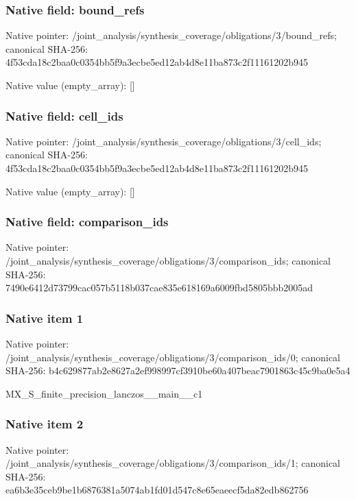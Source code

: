 \documentclass[10pt,a4paper]{article}
\begin{document}
\subsubsection{Native field: bound\_\allowbreak{}refs}
Native pointer: /joint\_\allowbreak{}analysis/synthesis\_\allowbreak{}coverage/obligations/3/bound\_\allowbreak{}refs; canonical SHA-256: 4f53cda18c2baa0c0354bb5f9a3ecbe5ed12ab4d8e11ba873c2f11161202b945

Native value (empty\_\allowbreak{}array): []

\subsubsection{Native field: cell\_\allowbreak{}ids}
Native pointer: /joint\_\allowbreak{}analysis/synthesis\_\allowbreak{}coverage/obligations/3/cell\_\allowbreak{}ids; canonical SHA-256: 4f53cda18c2baa0c0354bb5f9a3ecbe5ed12ab4d8e11ba873c2f11161202b945

Native value (empty\_\allowbreak{}array): []

\subsubsection{Native field: comparison\_\allowbreak{}ids}
Native pointer: /joint\_\allowbreak{}analysis/synthesis\_\allowbreak{}coverage/obligations/3/comparison\_\allowbreak{}ids; canonical SHA-256: 7490e6412d73799cac057b5118b037cae835e618169a6009fbd5805bbb2005ad

\subsubsection{Native item 1}
Native pointer: /joint\_\allowbreak{}analysis/synthesis\_\allowbreak{}coverage/obligations/3/comparison\_\allowbreak{}ids/0; canonical SHA-256: b4c629877ab2e8627a2ef998997cf3910be60a407beac7901863c45c9ba0e5a4

\begingroup\raggedright\sloppy MX\_\allowbreak{}S\_\allowbreak{}finite\_\allowbreak{}precision\_\allowbreak{}lanczos\_\allowbreak{}\_\allowbreak{}main\_\allowbreak{}\_\allowbreak{}c1\par\endgroup

\subsubsection{Native item 2}
Native pointer: /joint\_\allowbreak{}analysis/synthesis\_\allowbreak{}coverage/obligations/3/comparison\_\allowbreak{}ids/1; canonical SHA-256: ea6b3e35ceb9be1b6876381a5074ab1fd01d547c8e65eaeecf5da82edb862756
\end{document}
